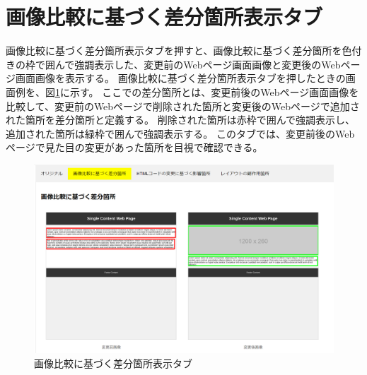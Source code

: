 \section{画像比較に基づく差分箇所表示タブ}\label{subsec:images_tab}
画像比較に基づく差分箇所表示タブを押すと、画像比較に基づく差分箇所を色付きの枠で囲んで強調表示した、変更前のWebページ画面画像と変更後のWebページ画面画像を表示する。
画像比較に基づく差分箇所表示タブを押したときの画面例を、図\ref{fig: Appearance_images_tab}に示す。
ここでの差分箇所とは、変更前後のWebページ画面画像を比較して、変更前のWebページで削除された箇所と変更後のWebページで追加された箇所を差分箇所と定義する。
削除された箇所は赤枠で囲んで強調表示し、追加された箇所は緑枠で囲んで強調表示する。
このタブでは、変更前後のWebページで見た目の変更があった箇所を目視で確認できる。
\begin{figure}[tp]
	\begin{center}
		\includegraphics[width=1.0\columnwidth]{image/3_images_tab.png}
		\caption{画像比較に基づく差分箇所表示タブ}
		\label{fig: Appearance_images_tab}
	\end{center}
\end{figure}



